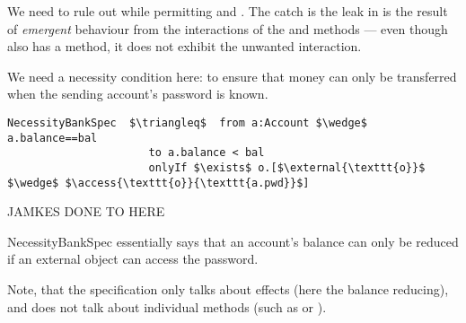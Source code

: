 We need to rule out  while permitting  and
. The catch is the leak in  is the result
of  \emph{emergent} behaviour from the interactions of the 
and  methods --- even though  also has a
 method, it does not exhibit the unwanted interaction.



We need a necessity condition here: to ensure that money can only be
transferred when the sending account's password is known.

 

 
 \begin{lstlisting}[language = Chainmail, mathescape=true, frame=lines]
NecessityBankSpec  $\triangleq$  from a:Account $\wedge$ a.balance==bal
                      to a.balance < bal
                      onlyIf $\exists$ o.[$\external{\texttt{o}}$ $\wedge$ $\access{\texttt{o}}{\texttt{a.pwd}}$]
\end{lstlisting}

JAMKES  DONE TO HERE

 NecessityBankSpec essentially says that an account's balance can only
 be reduced if an external object can access the password.
  
 
 Note, that the specification only talks about effects (here the balance reducing), and does not
 talk about individual methods (such as  or ).
 
